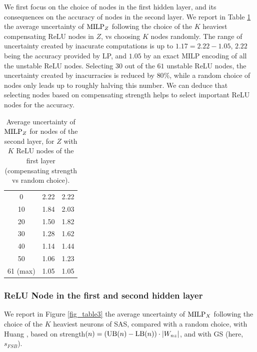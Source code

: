 We first focus on the choice of nodes in the first hidden layer, and its consequences on the accuracy of nodes in the second layer. 
We report in Table \ref{tab:example0} the average uncertainty of ${\textrm{MILP}}_Z$ following the choice of the $K$ heaviest compensating ReLU nodes in $Z$, vs choosing $K$ nodes randomly. The range of uncertainty created by inacurate computations is up to $1.17=2.22-1.05$, $2.22$ being the accuracy provided by LP, and $1.05$ by an exact MILP encoding of all the unstable ReLU nodes. Selecting $30$ out of the $61$ unstable ReLU nodes, the uncertainty created by inacurracies is reduced by $80\%$, while a random choice of nodes only leads up to roughly halving this number. We can deduce that selecting nodes based on compensating strength helps to select important ReLU nodes for the accuracy.



\begin{table}[h!]
	\centering
	\begin{tabular}{|c||c|c|}
		\hline
		\text{Number $K$ of nodes in $Z$}  &  \text{Compensate strength} & \text{Random Choice}  \\ \hline
		\hline
		0  &  2.22 & 2.22  \\ \hline
		10  &  1.84 & 2.03  \\ \hline
		20  &  1.50 & 1.82  \\ \hline
		30  &  1.28 & 1.62  \\ \hline
		40  &  1.14 & 1.44  \\ \hline
		50  &  1.06 & 1.23  \\ \hline
		61 (max) & 1.05 &  1.05 \\ \hline
	\end{tabular}
	\caption{Average uncertainty of ${\textrm{MILP}}_Z$ for nodes of the second layer, for $Z$ with $K$ ReLU nodes of the first layer (compensating strength vs random choice).}
	\label{tab:example0}
\end{table}




\subsubsection*{ReLU Node in the first and second hidden layer}
\fi


We report in Figure \ref{fig_table3} the average uncertainty of ${\textrm{MILP}}_X$ following the 
choice of the $K$ heaviest neurons of {\sf SAS}, compared with a random choice, with Huang \cite{DivideAndSlide}, based on strength$(n) = (\mathrm{UB}(n)-\mathrm{LB}(n))\cdot |W_{nz}|$, and with {\sf GS} (here, $s_{FSB}$).



